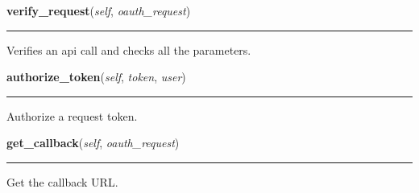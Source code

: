    \label{lib:oauth:OAuthServer:verify_request}

    \vspace{0.5ex}

\hspace{.8\funcindent}\begin{boxedminipage}{\funcwidth}

    \raggedright \textbf{verify\_request}(\textit{self}, \textit{oauth\_request})

    \vspace{-1.5ex}

    \rule{\textwidth}{0.5\fboxrule}
\setlength{\parskip}{2ex}
    Verifies an api call and checks all the parameters.

\setlength{\parskip}{1ex}
    \end{boxedminipage}

    \label{lib:oauth:OAuthServer:authorize_token}

    \vspace{0.5ex}

\hspace{.8\funcindent}\begin{boxedminipage}{\funcwidth}

    \raggedright \textbf{authorize\_token}(\textit{self}, \textit{token}, \textit{user})

    \vspace{-1.5ex}

    \rule{\textwidth}{0.5\fboxrule}
\setlength{\parskip}{2ex}
    Authorize a request token.

\setlength{\parskip}{1ex}
    \end{boxedminipage}

    \label{lib:oauth:OAuthServer:get_callback}

    \vspace{0.5ex}

\hspace{.8\funcindent}\begin{boxedminipage}{\funcwidth}

    \raggedright \textbf{get\_callback}(\textit{self}, \textit{oauth\_request})

    \vspace{-1.5ex}

    \rule{\textwidth}{0.5\fboxrule}
\setlength{\parskip}{2ex}
    Get the callback URL.

\setlength{\parskip}{1ex}
    \end{boxedminipage}

